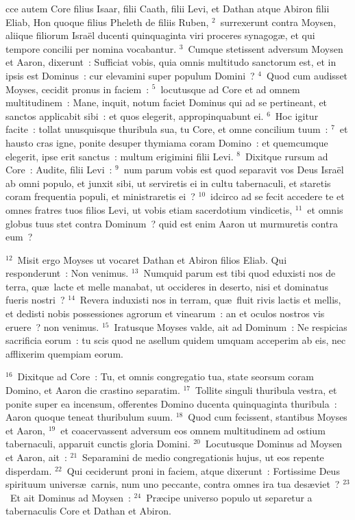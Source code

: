 \bchapter
{}cce autem Core filius Isaar, filii Caath, filii Levi, et Dathan atque Abiron filii Eliab, Hon quoque filius Pheleth de filiis Ruben,
${}^{2}$~surrexerunt contra Moysen, aliique filiorum Isra\"el ducenti quinquaginta viri proceres synagog\ae , et qui tempore concilii per nomina vocabantur.
${}^{3}$~Cumque stetissent adversum Moysen et Aaron, dixerunt~: Sufficiat vobis, quia omnis multitudo sanctorum est, et in ipsis est Dominus~: cur elevamini super populum Domini~?
${}^{4}$~Quod cum audisset Moyses, cecidit pronus in faciem~:
${}^{5}$~locutusque ad Core et ad omnem multitudinem~: Mane, inquit, notum faciet Dominus qui ad se pertineant, et sanctos applicabit sibi~: et quos elegerit, appropinquabunt ei.
${}^{6}$~Hoc igitur facite~: tollat unusquisque thuribula sua, tu Core, et omne concilium tuum~:
${}^{7}$~et hausto cras igne, ponite desuper thymiama coram Domino~: et quemcumque elegerit, ipse erit sanctus~: multum erigimini filii Levi.
${}^{8}$~Dixitque rursum ad Core~: Audite, filii Levi~:
${}^{9}$~num parum vobis est quod separavit vos Deus Isra\"el ab omni populo, et junxit sibi, ut serviretis ei in cultu tabernaculi, et staretis coram frequentia populi, et ministraretis ei~?
${}^{10}$~idcirco ad se fecit accedere te et omnes fratres tuos filios Levi, ut vobis etiam sacerdotium vindicetis,
${}^{11}$~et omnis globus tuus stet contra Dominum~? quid est enim Aaron ut murmuretis contra eum~?


${}^{12}$~Misit ergo Moyses ut vocaret Dathan et Abiron filios Eliab. Qui responderunt~: Non venimus.
${}^{13}$~Numquid parum est tibi quod eduxisti nos de terra, qu\ae\ lacte et melle manabat, ut occideres in deserto, nisi et dominatus fueris nostri~?
${}^{14}$~Revera induxisti nos in terram, qu\ae\ fluit rivis lactis et mellis, et dedisti nobis possessiones agrorum et vinearum~: an et oculos nostros vis eruere~? non venimus.
${}^{15}$~Iratusque Moyses valde, ait ad Dominum~: Ne respicias sacrificia eorum~: tu scis quod ne asellum quidem umquam acceperim ab eis, nec afflixerim quempiam eorum.


${}^{16}$~Dixitque ad Core~: Tu, et omnis congregatio tua, state seorsum coram Domino, et Aaron die crastino separatim.
${}^{17}$~Tollite singuli thuribula vestra, et ponite super ea incensum, offerentes Domino ducenta quinquaginta thuribula~: Aaron quoque teneat thuribulum suum.
${}^{18}$~Quod cum fecissent, stantibus Moyses et Aaron,
${}^{19}$~et coacervassent adversum eos omnem multitudinem ad ostium tabernaculi, apparuit cunctis gloria Domini.
${}^{20}$~Locutusque Dominus ad Moysen et Aaron, ait~:
${}^{21}$~Separamini de medio congregationis hujus, ut eos repente disperdam.
${}^{22}$~Qui ceciderunt proni in faciem, atque dixerunt~: Fortissime Deus spirituum univers\ae\ carnis, num uno peccante, contra omnes ira tua des\ae viet~?
${}^{23}$~Et ait Dominus ad Moysen~:
${}^{24}$~Pr\ae cipe universo populo ut separetur a tabernaculis Core et Dathan et Abiron.



